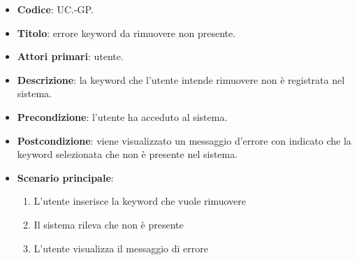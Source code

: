	\begin{itemize}
		\item \textbf{Codice}: UC\theuccount.\thesubuccount-GP.
		\item \textbf{Titolo}: errore keyword da rimuovere non presente.
		\item \textbf{Attori primari}: utente.
		\item \textbf{Descrizione}: la keyword che l'utente intende rimuovere non è registrata nel sistema.
		\item \textbf{Precondizione}: l’utente ha acceduto al sistema.
		\item \textbf{Postcondizione}: viene visualizzato un messaggio d'errore con indicato che la keyword	selezionata che non è presente nel sistema.
		\item \textbf{Scenario principale}:
		\begin{enumerate}
			\item L'utente inserisce la keyword che vuole rimuovere
			\item Il sistema rileva che non è presente
			\item L'utente visualizza il messaggio di errore
		\end{enumerate}
	\end{itemize}
